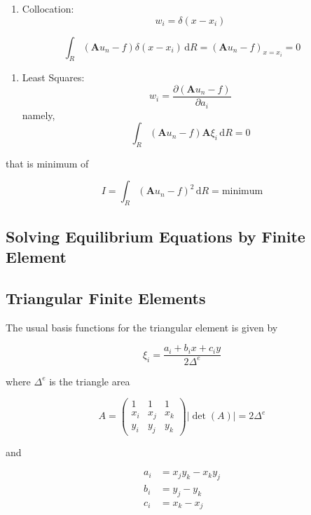 \documentclass{article}
\begin{document}
\begin{enumerate}
\def\labelenumi{\arabic{enumi}.}
\setcounter{enumi}{1}
\itemsep1pt\parskip0pt
\item
  Collocation: \[w_i = \delta(x-x_i)\]
\end{enumerate}

\[
   \int_R \left(\mathbf{A} u_n - f\right) \delta(x-x_i) \, \mathrm{d}R = \left(\mathbf{A} u_n - f\right)_{x=x_i} = 0
   \]

\begin{enumerate}
\def\labelenumi{\arabic{enumi}.}
\setcounter{enumi}{2}
\itemsep1pt\parskip0pt
\item
  Least Squares:
  \[w_i = \frac{\partial \left(\mathbf{A} u_n - f\right)}{\partial a_i}\]
  namely, \[
     \int_R \left(\mathbf{A} u_n - f\right) \mathbf{A} \xi_i \, \mathrm{d}R = 0
     \]
\end{enumerate}

that is minimum of

\[
   I = \int_R \left(\mathbf{A} u_n - f\right)^2 \, \mathrm{d}R = \text{minimum}
   \]

\subsection{Solving Equilibrium Equations by Finite
Element}\label{solving-equilibrium-equations-by-finite-element}

\subsection{Triangular Finite
Elements}\label{triangular-finite-elements}

The usual basis functions for the triangular element is given by

\[
\xi_i = \frac{a_i + b_i x + c_i y}{2\Delta^e}
\]

where \(\Delta^e\) is the triangle area

\[
A = \left( 
\begin{matrix}
  1 &   1 &   1 \\
x_i & x_j & x_k \\
y_i & y_j & y_k 
\end{matrix}
\right) \left| \det(A) \right| = 2 \Delta^e
\]

and


\begin{align*}
a_i &= x_j y_k - x_k y_j \\
b_i &= y_j - y_k \\
c_i &= x_k - x_j
\end{align*}
\end{document}
